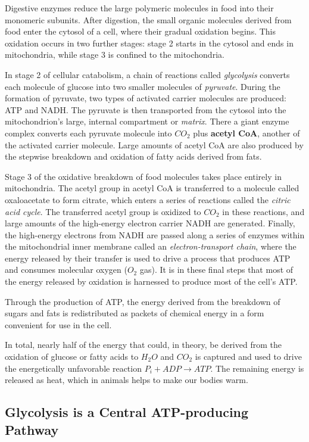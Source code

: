 Digestive enzymes reduce the large polymeric molecules in food into
their monomeric subunits. After digestion, the
small organic molecules derived from food enter the cytosol of a cell,
where their gradual oxidation begins. This
oxidation occurs in two further stages: stage 2 starts in the cytosol and
ends in mitochondria, while stage 3 is confined to the mitochondria.

In stage 2 of cellular catabolism, a chain of reactions called \textit{glycolysis}
converts each molecule of glucose into two smaller molecules of \textit{pyruvate}.
During the formation of pyruvate, two types of activated carrier molecules are produced:
ATP and NADH. The pyruvate is then transported from the cytosol into
the mitochondrion’s large, internal compartment or \textit{matrix}. There a giant
enzyme complex converts each pyruvate molecule into $CO_{2}$ plus \textbf{acetyl
CoA}, another of the activated carrier molecule. Large amounts of acetyl CoA are also produced by the
stepwise breakdown and oxidation of fatty acids derived from fats.

Stage 3 of the oxidative breakdown of food molecules takes place entirely
in mitochondria. The acetyl group in acetyl CoA is transferred to a molecule
called oxaloacetate to form citrate, which enters a series of reactions
called the \textit{citric acid cycle}. The transferred acetyl group is oxidized to $CO_2$
in these reactions, and large amounts of the high-energy electron carrier
NADH are generated. Finally, the high-energy electrons from NADH are
passed along a series of enzymes within the mitochondrial inner membrane
called an \textit{electron-transport chain}, where the energy released by
their transfer is used to drive a process that produces ATP and consumes
molecular oxygen ($O_2$ gas). It is in these final steps that most of the energy
released by oxidation is harnessed to produce most of the cell’s ATP.

Through the production of ATP, the energy derived from the breakdown
of sugars and fats is redistributed as packets of chemical energy in a
form convenient for use in the cell.

In total, nearly half of the energy that could, in theory, be derived from
the oxidation of glucose or fatty acids to $H_{2}O$ and $CO_2$ is captured and
used to drive the energetically unfavorable reaction $P_{i} + ADP \rightarrow ATP$.
The remaining energy is released as heat, which in animals
helps to make our bodies warm.

\subsection{Glycolysis is a Central ATP-producing Pathway}


